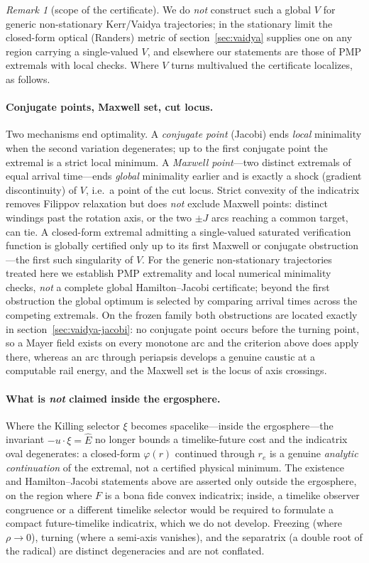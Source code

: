 \documentclass[12pt]{iopart}
\newcommand{\Ehat}{\hat E}
\newcommand{\re}{r_{e}}
\theoremstyle{plain}
\theoremstyle{definition}
\theoremstyle{plain}
\theoremstyle{remark}
\newtheorem*{remark}{Remark}
\begin{document}
\begin{remark}[scope of the certificate]
We do \emph{not} construct such a global $V$ for generic non-stationary Kerr/Vaidya
trajectories; in the stationary limit the closed-form optical (Randers) metric of
section~\ref{sec:vaidya} supplies one on any region carrying a single-valued $V$, and
elsewhere our statements are those of PMP extremals with local checks. Where $V$ turns
multivalued the certificate localizes, as follows.
\end{remark}

\paragraph{Conjugate points, Maxwell set, cut locus.} Two mechanisms end
optimality. A \emph{conjugate point} (Jacobi) ends \emph{local} minimality when
the second variation degenerates; up to the first conjugate point the extremal is
a strict local minimum. A \emph{Maxwell point}---two distinct extremals of equal
arrival time---ends \emph{global} minimality earlier and is exactly a shock
(gradient discontinuity) of $V$, i.e.\ a point of the cut locus. Strict convexity
of the indicatrix removes Filippov relaxation but does \emph{not} exclude Maxwell
points: distinct windings past the rotation axis, or the two $\pm J$ arcs reaching
a common target, can tie. A closed-form extremal admitting a single-valued saturated
verification function is globally certified only up to its first Maxwell or conjugate
obstruction---the first such singularity of $V$. For the generic non-stationary
trajectories treated here we establish PMP extremality and local numerical minimality
checks, \emph{not} a complete global Hamilton--Jacobi certificate; beyond the first
obstruction the global optimum is selected by comparing arrival times across the competing
extremals. On the frozen family both obstructions are located exactly in
section~\ref{sec:vaidya-jacobi}: no conjugate point occurs before the turning point, so a
Mayer field exists on every monotone arc and the criterion above does apply there, whereas
an arc through periapsis develops a genuine caustic at a computable rail energy, and the
Maxwell set is the locus of axis crossings.

\paragraph{What is \emph{not} claimed inside the ergosphere.} Where the Killing
selector $\xi$ becomes spacelike---inside the ergosphere---the invariant
$-u\cdot\xi=\Ehat$ no longer bounds a timelike-future cost and the indicatrix oval
degenerates: a closed-form $\varphi(r)$ continued through $\re$ is a genuine
\emph{analytic continuation} of the
extremal, not a certified physical minimum. The existence and Hamilton--Jacobi
statements above are asserted only outside the ergosphere, on the region where $F$
is a bona fide convex indicatrix; inside, a timelike observer congruence or a different
timelike selector would be required to formulate a compact future-timelike indicatrix,
which we do not develop. Freezing (where
$\rho\to0$), turning (where a semi-axis vanishes), and the separatrix (a double
root of the radical) are distinct degeneracies and are not conflated.
\end{document}
